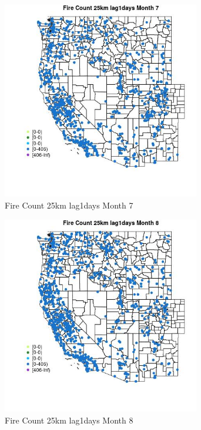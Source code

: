 \begin{figure} 
\centering  
\includegraphics[width=0.77\textwidth]{Code_Outputs/Report_ML_input_PM25_Step4_part_f_de_duplicated_aveswNAs_MapObsMo7Fire_Count_25km_lag1days.jpg} 
\caption{\label{fig:Report_ML_input_PM25_Step4_part_f_de_duplicated_aveswNAsMapObsMo7Fire_Count_25km_lag1days}Fire Count 25km lag1days Month 7} 
\end{figure} 
 

\begin{figure} 
\centering  
\includegraphics[width=0.77\textwidth]{Code_Outputs/Report_ML_input_PM25_Step4_part_f_de_duplicated_aveswNAs_MapObsMo8Fire_Count_25km_lag1days.jpg} 
\caption{\label{fig:Report_ML_input_PM25_Step4_part_f_de_duplicated_aveswNAsMapObsMo8Fire_Count_25km_lag1days}Fire Count 25km lag1days Month 8} 
\end{figure} 
 

